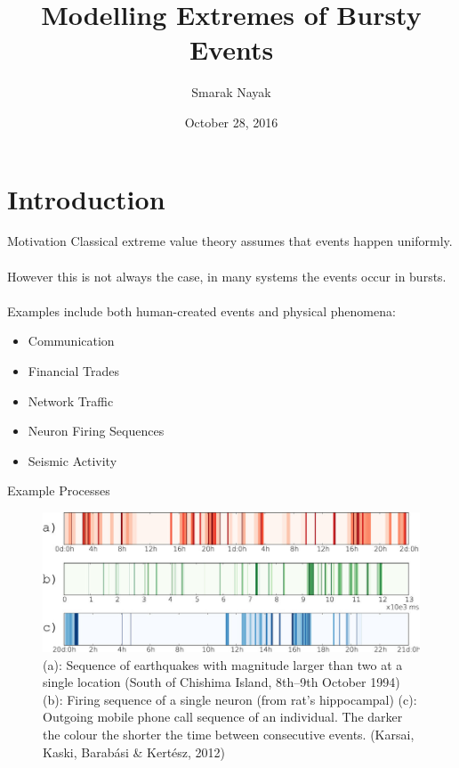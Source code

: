\documentclass{beamer}
\title{Modelling Extremes of Bursty Events}
\author{Smarak Nayak}
\date{October 28, 2016}
\begin{document}
 
\frame{\titlepage}
\section{Introduction}

\begin{frame}{Motivation}
	Classical extreme value theory assumes that events happen uniformly. \\~\\
	
	However this is not always the case, in many systems the events occur in bursts. \\~\\
	
	Examples include both human-created events and physical phenomena:
		\begin{itemize}
		\item Communication
		\item Financial Trades 
		\item Network Traffic
		\item Neuron Firing Sequences
		\item Seismic Activity
	    \end{itemize}
	
\end{frame}

\begin{frame}{Example Processes}
	
    \begin{figure}
        \centering
        \includegraphics[scale=1.4]{BurstyGraphs}
        \caption{(a): Sequence of earthquakes with magnitude larger than two at a single location (South of Chishima Island, 8th–9th October 1994) (b): Firing sequence of a single neuron (from rat's hippocampal) (c): Outgoing mobile phone call sequence of an individual. The darker the colour the shorter the time between consecutive events. (Karsai, Kaski, Barabási \& Kertész, 2012)}
    \end{figure}
\end{frame}
 
\end{document}
